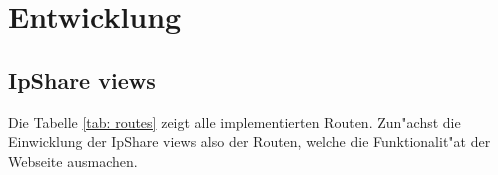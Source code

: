 


\chapter{Entwicklung}

\section{IpShare views}\label{sec:ip_share_views}
Die Tabelle \ref{tab: routes} zeigt alle implementierten Routen.
Zun{"a}chst die Einwicklung der IpShare views also der Routen, welche die Funktionalit{"a}t der Webseite ausmachen.

